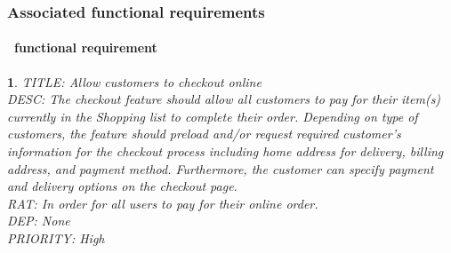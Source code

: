 \documentclass{scrreprt}
\theoremstyle{funreq}
\newtheorem{funreq}{}
\begin{document}
\subsubsection{Associated functional requirements}
	
	
	\paragraph[]{\Subsectionname ~functional requirement }
	\begin{funreq}
		\label{online_checkout}
		TITLE: Allow customers to checkout online\\
		DESC: The checkout feature should allow all customers to pay for their item(s) currently in the Shopping list to complete their order. Depending on type of customers, the feature should preload and/or request required customer’s information for the checkout process including home address for delivery, billing address, and payment method. Furthermore, the customer can specify payment and delivery options on the checkout page.\\
		RAT: In order for all users to pay for their online order.\\
		DEP: None\\
		PRIORITY: High\\
		\end{funreq}
		\goodbreak
\end{document}
